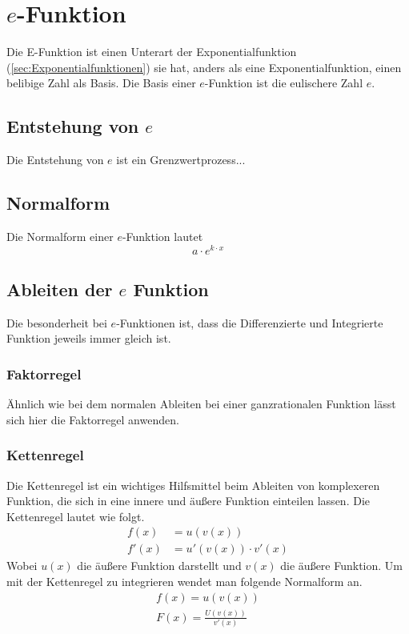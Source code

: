 \section{$e$-Funktion}\label{sec:e-Funktion}
Die E-Funktion ist einen Unterart der Exponentialfunktion (\ref{sec:Exponentialfunktionen}) sie hat, anders als eine Exponentialfunktion, einen belibige Zahl als Basis. Die Basis einer $e$-Funktion ist die eulischere Zahl $e$. 
\subsection{Entstehung von $e$} \label{sec:E-Funktion/Entstehung von e}
Die Entstehung von $e$ ist ein Grenzwertprozess...

\subsection{Normalform}\label{sec:E-Funktion/Normalform}
Die Normalform einer $e$-Funktion lautet
\[a\cdot e^{k\cdot x}\]

\subsection{Ableiten der $e$ Funktion}\label{sec:E-Funktion/Ableiten der e Funktion}
Die besonderheit bei $e$-Funktionen ist, dass die Differenzierte und Integrierte Funktion jeweils immer gleich ist. 
\subsubsection{Faktorregel}\label{sec:E-Funktion/Normalform} 
Ähnlich wie bei dem normalen Ableiten bei einer ganzrationalen Funktion lässt sich hier die Faktorregel anwenden.
\subsubsection{Kettenregel}
Die Kettenregel ist ein wichtiges Hilfsmittel beim Ableiten von komplexeren Funktion, die sich in eine innere und äußere Funktion einteilen lassen. Die Kettenregel lautet wie folgt.
\begin{align*}
	f(x)&=u(v(x))\\
	f'(x)&=u'(v(x))\cdot v'(x)
\end{align*}
Wobei $u(x)$ die äußere Funktion darstellt und $v(x)$ die äußere Funktion. 
Um mit der Kettenregel zu integrieren wendet man folgende Normalform an. 
\begin{align*}
	f(x)=u(v(x))\\
	F(x)=\frac{U(v(x))}{v'(x)}
\end{align*}
